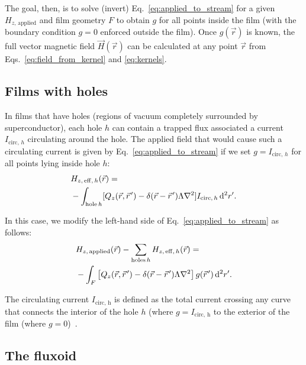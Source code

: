 \documentclass[final,3p,times,twocolumn]{elsarticle}
\newcommand{\pvec}[1]{\vec{#1}\mkern2mu\vphantom{#1}}
\newcounter{bla}
\begin{document}
The goal, then, is to solve (invert) Eq.~\ref{eq:applied_to_stream} for a given $H_{z,\,\mathrm{applied}}$ and film geometry $F$ to obtain $g$ for all points inside the film (with the boundary condition $g=0$ enforced outside the film). Once $g(\vec{r})$ is known, the full vector magnetic field $\vec{H}(\vec{r})$ can be calculated at any point $\vec{r}$
from Eqs.~\ref{eq:field_from_kernel} and \ref{eq:kernels}.

\subsection{Films with holes}
\label{section:model:holes}

In films that have holes (regions of vacuum completely surrounded by superconductor), each hole $h$ can contain a trapped flux associated a current $I_{\mathrm{circ},\,h}$ circulating around the hole. The applied field that would cause such a circulating current is given by Eq.~\ref{eq:applied_to_stream} if we set $g=I_{\mathrm{circ},\,h}$ for all points lying inside hole $h$:
\begin{align}
\begin{split}
    \label{eq:Heff}
    &H_{z,\,\mathrm{eff},\,h}(\vec{r}) = \\
    &-\int_{\mathrm{hole}\,h}[
        Q_z(\vec{r},\pvec{r}')-\delta(\vec{r}-\pvec{r}')\Lambda\nabla^2
    ] I_{\mathrm{circ},\,h} \,\mathrm{d}^2r'.   
\end{split}
\end{align}

In this case, we modify the left-hand side of Eq.~\ref{eq:applied_to_stream} as follows:
\begin{align}
\begin{split}
    \label{eq:Heff_sub}
    &H_{z,\,\mathrm{applied}}(\vec{r}) - \sum_{\mathrm{holes}\,h} H_{z,\,\mathrm{eff},\,h}(\vec{r})
    = \\&-\int_F\left[
        Q_z(\vec{r},\pvec{r}')-\delta(\vec{r}-\pvec{r}')\Lambda\nabla^2\right
    ]g(\pvec{r}')\,\mathrm{d}^2r'.
\end{split}
\end{align}

The circulating current $I_\mathrm{circ,\,h}$ is defined as the total current crossing any curve that connects the interior of the hole $h$ (where $g=I_\mathrm{circ,\,h}$ to the exterior of the film (where $g=0$)~\cite{Khapaev2001-pw,Brandt2005-wj}.

\subsection{The fluxoid}
\label{section:model:fluxoid}
\end{document}
